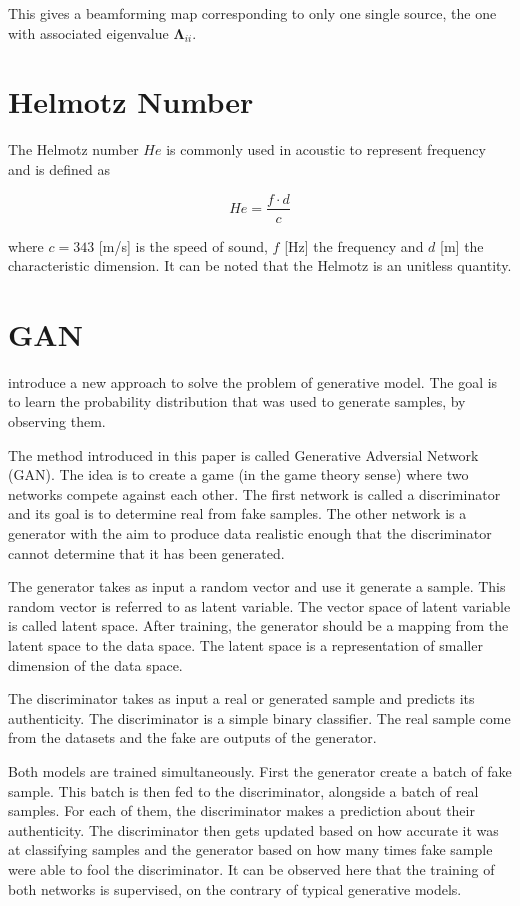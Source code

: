 \documentclass[11pt,a4paper,twoside]{report}
\begin{document}
This gives a beamforming map corresponding to only one single source, the one with associated eigenvalue $\mathbf{\Lambda}_{ii}$.

\section{Helmotz Number}

The Helmotz number $He$ is commonly used in acoustic to represent frequency and is defined as

\begin{equation}
    He = \frac{f \cdot d}{c}  
\end{equation}

where $c = 343$ [m/s] is the speed of sound, $f$ [Hz] the frequency and $d$ [m] the characteristic dimension. It can be noted that the Helmotz is an unitless quantity. 

\section{GAN}

\cite{goodfellow2020generative} introduce a new approach to solve the problem of generative model. The goal is to learn the probability distribution that was used to generate samples, by observing them.

The method introduced in this paper is called Generative Adversial Network (GAN). The idea is to create a game (in the game theory sense) where two networks compete against each other. The first network is called a discriminator and its goal is to determine real from fake samples. The other network is a  generator with the aim to produce data realistic enough that the discriminator cannot determine that it has been generated.

The generator takes as input a random vector and use it generate a sample. This random vector is referred to as latent variable. The vector space of latent variable is called latent space. After training, the generator should be a mapping from the latent space to the data space. The latent space is  a representation of smaller dimension of the data space.

The discriminator takes as input a real or generated sample and predicts its authenticity. The discriminator is a simple binary classifier. The real sample come from the datasets and the fake are outputs of the generator.

Both models are trained simultaneously. First the generator create a batch of fake sample. This batch is then fed to the discriminator, alongside a batch of real samples. For each of them, the discriminator makes a prediction about their authenticity. The discriminator then gets updated based on how accurate it was at classifying samples and the generator based on how many times fake sample were able to fool the discriminator. It can be observed here that the training of both networks is supervised, on the contrary of typical generative models.
\end{document}
